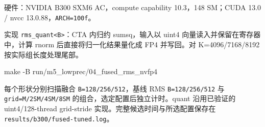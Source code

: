 \documentclass[11pt,a4paper,fontset=fandol]{ctexart}
\newenvironment{Shaded}{}{}
\newcommand{\AttributeTok}[1]{\textcolor[rgb]{0.49,0.56,0.16}{#1}}
\newcommand{\FunctionTok}[1]{\textcolor[rgb]{0.02,0.16,0.49}{#1}}
\newcommand{\NormalTok}[1]{#1}
\begin{document}
\begin{answer}

硬件：NVIDIA B300 SXM6 AC，compute capability 10.3，148 SM；CUDA 13.0 /
nvcc 13.0.88，\texttt{ARCH=\allowbreak{}100f}。

实现 \texttt{rms\_\allowbreak{}quant\textless{}B\textgreater{}}：CTA
内归约 sumsq，输入以 uint4 向量读入并保留在寄存器中，计算 rnorm
后直接将归一化结果量化成 FP4 并写回。对 K=4096/7168/8192
按实际组长度处理尾部。

\begin{Shaded}
\begin{Highlighting}[]
\FunctionTok{make} \AttributeTok{{-}B}\NormalTok{ run/m5\_lowprec/04\_fused\_rms\_nvfp4}
\end{Highlighting}
\end{Shaded}

每个形状分别扫描融合
\texttt{B=\allowbreak{}128/\allowbreak{}256/\allowbreak{}512}，基线 RMS
\texttt{B=\allowbreak{}128/\allowbreak{}256/\allowbreak{}512} 与
\texttt{grid=\allowbreak{}M/\allowbreak{}2SM/\allowbreak{}4SM/\allowbreak{}8SM}
的组合，选定配置后独立计时。quant 沿用已验证的 uint4/128-thread
grid-stride 实现。完整候选时间与所选配置保存在
\texttt{results/\allowbreak{}b300/\allowbreak{}fused-\allowbreak{}tuned.\allowbreak{}log}。


\end{answer}
\end{document}
